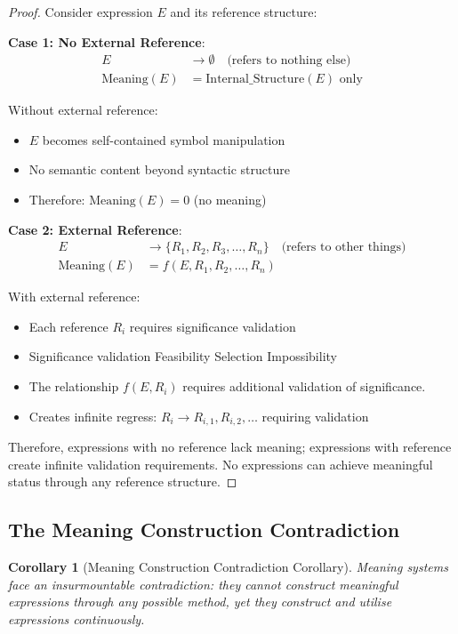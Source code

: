\documentclass[12pt,a4paper]{article}
\newtheorem{corollary}[theorem]{Corollary}
\begin{document}
\begin{proof}
Consider expression $E$ and its reference structure:

\textbf{Case 1: No External Reference}:
\begin{align}
E &\rightarrow \emptyset \quad \text{(refers to nothing else)} \\
\text{Meaning}(E) &= \text{Internal\_Structure}(E) \text{ only}
\end{align}

Without external reference:
\begin{itemize}
\item $E$ becomes self-contained symbol manipulation
\item No semantic content beyond syntactic structure
\item Therefore: $\text{Meaning}(E) = 0$ (no meaning)
\end{itemize}

\textbf{Case 2: External Reference}:
\begin{align}
E &\rightarrow \{R_1, R_2, R_3, \ldots, R_n\} \quad \text{(refers to other things)} \\
\text{Meaning}(E) &= f(E, R_1, R_2, \ldots, R_n)
\end{align}

With external reference:
\begin{itemize}
\item Each reference $R_i$ requires significance validation
\item Significance validation Feasibility Selection Impossibility
\item The relationship $f(E, R_i)$ requires additional validation of significance.
\item Creates infinite regress: $R_i \rightarrow R_{i,1}, R_{i,2}, \ldots$ requiring validation
\end{itemize}

Therefore, expressions with no reference lack meaning; expressions with reference create infinite validation requirements. No expressions can achieve meaningful status through any reference structure.
\end{proof}

\subsection{The Meaning Construction Contradiction}

\begin{corollary}[Meaning Construction Contradiction Corollary]
Meaning systems face an insurmountable contradiction: they cannot construct meaningful expressions through any possible method, yet they construct and utilise expressions continuously.
\end{corollary}
\end{document}

